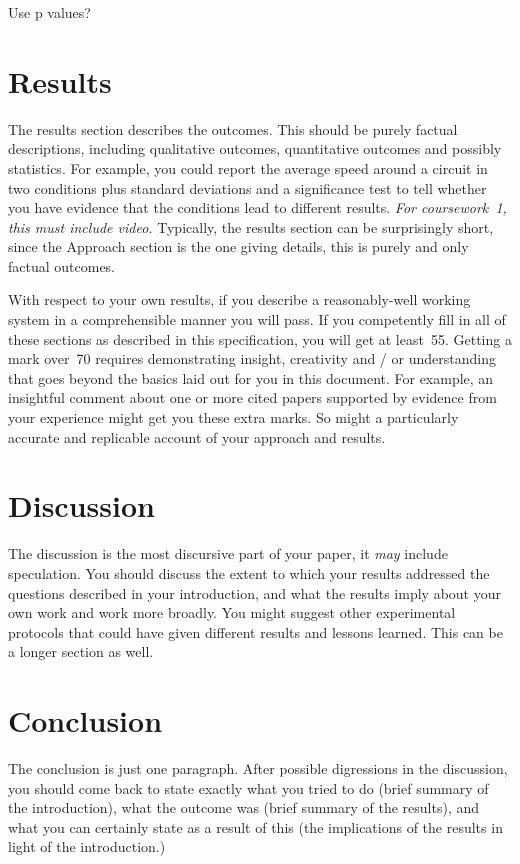 \documentclass[a4paper,12pt]{article}
\begin{document}
Use p values?

\section{Results}

The results section describes the outcomes.  This should be purely
factual descriptions, including qualitative outcomes, quantitative
outcomes and possibly statistics.  For example, you could report the
average speed around a circuit in two conditions plus standard
deviations and a significance test to tell whether you have evidence
that the conditions lead to different results. {\em For coursework~1, this
must include video.}  Typically, the results section can be
surprisingly short, since the Approach section is the one giving
details, this is purely and only factual outcomes.

With respect to your own results, if you describe a reasonably-well
working system in a comprehensible manner you will pass.  If you
competently fill in all of these sections as described in this
specification, you will get at least~55.  Getting a mark over~70
requires demonstrating insight, creativity and / or understanding that
goes beyond the basics laid out for you in this document.  For
example, an insightful comment about one or more cited papers
supported by evidence from your experience might get you these extra
marks.  So might a particularly accurate and replicable account of
your approach and results.

\section{Discussion}

The discussion is the most discursive part of your paper, it {\em may}
include speculation. You should discuss the extent to which your
results addressed the questions described in your introduction, and
what the results imply about your own work and work more broadly.  You
might suggest other experimental protocols that could have given
different results and lessons learned.  This can be a longer section
as well.

\section{Conclusion}
The conclusion is just one paragraph.  After possible digressions in
the discussion, you should come back to state exactly what you tried
to do (brief summary of the introduction), what the outcome was (brief
summary of the results), and what you can certainly state as a
result of this (the implications of the results in light of the introduction.)

%
%
\printbibliography
\end{document}
